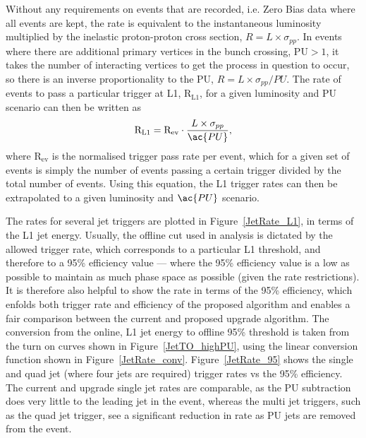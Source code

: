 Without any requirements on events that are recorded, i.e. Zero Bias data where all events are kept, the rate is 
equivalent to the instantaneous luminosity multiplied by the inelastic proton-proton cross section, $R = L\times \sigma_{pp}$. 
In events where there are additional primary vertices in the bunch crossing, \ac{PU}$>1$, it takes the number of interacting vertices to get the process in question to occur, so there is an inverse proportionality to the \ac{PU}, $R = L\times \sigma_{pp}/PU$.
The rate of events to pass a particular trigger at \ac{L1}, $\text{R}_{\text{L1}}$, for a given luminosity and \ac{PU} scenario can then be written as
%
\begin{equation}
\text{R}_{\rm L1} = \text{R}_{\text{ev}} \cdot \frac{L\times \sigma_{pp}}{\ac{PU}},
\end{equation}
%
where $\text{R}_{\text{ev}}$ is the normalised trigger pass rate per event, which for a given set of events is simply the number of events passing a certain trigger divided by the total number of events.
%
Using this equation, the \ac{L1} trigger rates can then be extrapolated to a given luminosity and $\ac{PU}$ scenario.


The rates for several jet triggers are plotted in Figure~\ref{JetRate_L1}, in terms of the \ac{L1} jet energy.
%
Usually, the offline cut used in analysis is dictated by the allowed trigger rate, which corresponds to a particular \ac{L1} threshold, and therefore to a 95\% efficiency value --- where the 95\% efficiency value is a low as possible to maintain as much phase space as possible (given the rate restrictions).
It is therefore also helpful to show the rate in terms of the 95\% efficiency, which enfolds both trigger rate and efficiency of the proposed algorithm and enables a fair comparison between the current and proposed upgrade algorithm.
The conversion from the online, \ac{L1} jet energy to offline 95\% threshold is taken from the turn on curves shown in Figure~\ref{JetTO_highPU}, using the linear conversion function shown in Figure~\ref{JetRate_conv}.
Figure~\ref{JetRate_95} shows the single and quad jet (where four jets are required) trigger rates vs the 95\% efficiency. 
The current and upgrade single jet rates are comparable, as the PU subtraction does very little to the leading jet in the event, whereas the multi jet triggers, such as the quad jet trigger, see a significant reduction in rate as PU jets are removed from the event.     


